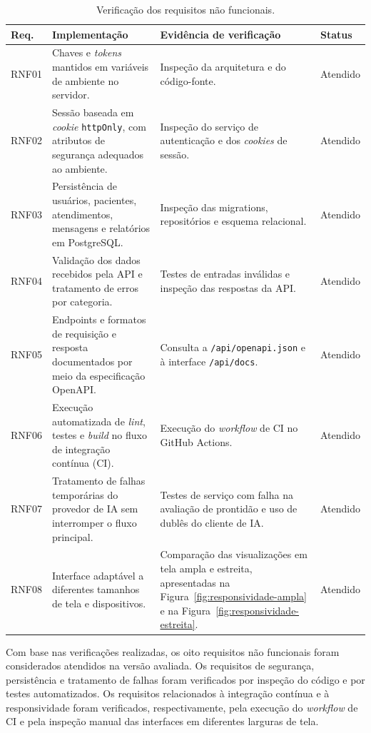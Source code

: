 \begin{table}[htb]
\centering
\caption{Verificação dos requisitos não funcionais.}
\label{tab:verificacao-rnf}
\begin{tabularx}{\textwidth}{p{1.2cm}p{5.0cm}Yp{2.0cm}}
\hline
\textbf{Req.} & \textbf{Implementação} & \textbf{Evidência de verificação} & \textbf{Status} \\
\hline
RNF01 & Chaves e \textit{tokens} mantidos em variáveis de ambiente no servidor. & Inspeção da arquitetura e do código-fonte. & Atendido \\
RNF02 & Sessão baseada em \textit{cookie} \texttt{httpOnly}, com atributos de segurança adequados ao ambiente. & Inspeção do serviço de autenticação e dos \textit{cookies} de sessão. & Atendido \\
RNF03 & Persistência de usuários, pacientes, atendimentos, mensagens e relatórios em PostgreSQL. & Inspeção das migrations, repositórios e esquema relacional. & Atendido \\
RNF04 & Validação dos dados recebidos pela API e tratamento de erros por categoria. & Testes de entradas inválidas e inspeção das respostas da API. & Atendido \\
RNF05 & Endpoints e formatos de requisição e resposta documentados por meio da especificação OpenAPI. & Consulta a \texttt{/api/openapi.json} e à interface \texttt{/api/docs}. & Atendido \\
RNF06 & Execução automatizada de \textit{lint}, testes e \textit{build} no fluxo de integração contínua (CI). & Execução do \textit{workflow} de CI no GitHub Actions. & Atendido \\
RNF07 & Tratamento de falhas temporárias do provedor de IA sem interromper o fluxo principal. & Testes de serviço com falha na avaliação de prontidão e uso de dublês do cliente de IA. & Atendido \\
RNF08 & Interface adaptável a diferentes tamanhos de tela e dispositivos. & Comparação das visualizações em tela ampla e estreita, apresentadas na Figura~\ref{fig:responsividade-ampla} e na Figura~\ref{fig:responsividade-estreita}. & Atendido \\
\hline
\end{tabularx}
\end{table}

Com base nas verificações realizadas, os oito requisitos não funcionais foram
considerados atendidos na versão avaliada. Os requisitos de segurança,
persistência e tratamento de falhas foram verificados por inspeção do código e
por testes automatizados. Os requisitos relacionados à integração contínua e à
responsividade foram verificados, respectivamente, pela execução do \textit{workflow}
de CI e pela inspeção manual das interfaces em diferentes larguras de tela.

